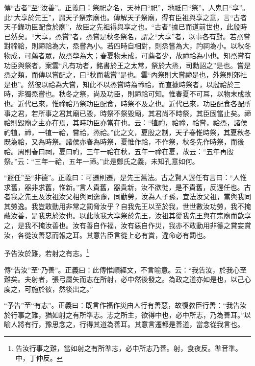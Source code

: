 {\noindent\zhuan{}\fzbyks 傳“古者”至“汝善”。正義曰：祭祀之名，天神曰“祀”，地祇曰“祭”，人鬼曰“享”。此“大享於先王”，謂天子祭宗廟也。傳解天子祭廟，得有臣祖與享之意，言“古者天子錄功臣配食於廟”，故臣之先祖得與享之也。“古者”據已而道前世也，此殷時已然矣。“大享，烝嘗”者，烝嘗是秋冬祭名，謂之“大享”者，以事各有對。若烝嘗對禘祫，則禘祫為大，烝嘗為小。若四時自相對，則烝嘗為大，礿祠為小。以秋冬物成，可薦者眾，故烝學為大；春夏物未成，可薦者少，故禘祫為小也。知烝嘗有功臣與祭者，案雲“凡有功者，銘書於王之太常，祭於大烝，司勳詔之”是也。嘗是烝之類，而傳以嘗配之，曰“秋而載嘗”是也。雲“內祭則大嘗禘是也，外祭則郊社是也”。然彼以祫為大嘗，知此不以烝嘗時為禘祫，而直據時祭者，以殷祫於三時，非獨烝嘗也。秋冬之祭，尚及功臣，則禘祫可知。惟春夏不可耳，以物末成故也。近代已來，惟禘祫乃祭功臣配食，時祭不及之也。近代已來，功臣配食各配所事之君，若所事之君其廟已毀，時祭不祭毀廟，其君尚不時祭，其臣固當止矣。禘祫則毀廟之主亦在焉，其時功臣亦當在也。云：“犆礿，祫禘，祫嘗，祫烝，諸侯礿犆，禘，一犆一祫，嘗祫，烝祫。”此之文，夏殷之制，天子春惟時祭，其夏秋冬既為祫，又為時祭。諸侯亦春為時祭，夏惟作祫，不作祭，秋冬先作時祭，而後祫。周則春曰祠，夏曰礿，三年一祫在秋，五年一禘在夏，故云：“五年再殷祭。”云：“三年一祫，五年一禘。”此是鄭氏之義，未知孔意如何。 \par}

{\noindent\shu{}\fzkt “遟任”至“非德”。正義曰：可遷則遷，是先王舊法。古之賢人遟任有言曰：“人惟求舊，器非求舊，惟新。”言人貴舊，器貴新，汝不欲徙，是不貴舊，反遟任也。古者我之先王及汝祖汝父相與同逸豫，同勤勞，汝為人子孫，宜法汝父祖，當與我同其勞逸。我豈敢動用非常之罰脅汝乎？自我先王以至於我，世世數汝功勞，我不掩蔽汝善，是我忠於汝也。以此故我大享祭於先王，汝祖其從我先王與在宗廟而歆享之，是我不掩汝善也。汝有善自作福，汝有惡自作災，我亦不敢動用非德之賞妄賞汝，各從汝善惡而報之耳。其意告臣言從上必有賞，違命必有罰也。 \par}

予告汝於難，若射之有志。\footnote{告汝行事之難，當如射之有所準志，必中所志乃善。射，食夜反。準音準。中，丁仲反。}

{\noindent\zhuan{}\fzbyks 傳“告汝”至“乃善”。正義曰：此傳惟順經文，不言喻意。云：“我告汝，於我心至難矣。夫射者，張弓屬矢而志在所射，必中然後發之。為政之道亦如是也，以己心度之，可施於彼，然後出之。” \par}

{\noindent\shu{}\fzkt “予告”至“有志”。正義曰：既言作福作災由人行有善惡，故復教臣行善：“我告汝於行事之難，猶如射之有所準志。志之所主，欲得中也，必中所志，乃為善耳。”以喻人將有行，豫思念之，行得其道為善耳。其意言遷都是善道，當念從我言也。 \par}

